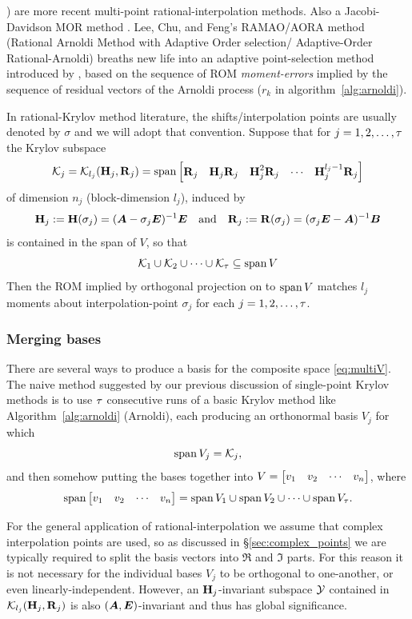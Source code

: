 \cite{RAMAO,AORA,lassaux2003model,frangos2008}) are more recent multi-point rational-interpolation methods. Also a Jacobi-Davidson MOR method \cite{jacobiMOR}.   Lee, Chu, and Feng's  RAMAO/AORA method (Rational Arnoldi Method with Adaptive Order selection/ Adaptive-Order Rational-Arnoldi) \cite{RAMAO,AORA} breaths new life into an adaptive point-selection method introduced by \cite{gallivan1996rational}, based on the sequence of ROM \emph{moment-errors} implied by the sequence of residual vectors of the Arnoldi process ($r_k$ in algorithm~\ref{alg:arnoldi}).

In rational-Krylov method literature, the shifts/interpolation points are usually denoted by $\sigma$ and we will adopt that convention.   Suppose that for $j = 1,2,\ldots,\tau$ the Krylov subspace 
\[ 
\mathcal{K}_j=\mathcal{K}_{l_j}({\textbf{\textup{H}}_j},{\textbf{\textup{R}}_j}) = \operatorname*{span}\begin{bmatrix} \textbf{\textup{R}}_j & \textbf{\textup{H}}_j \textbf{\textup{R}}_j & \textbf{\textup{H}}_j^2 \textbf{\textup{R}}_j & \cdots & \textbf{\textup{H}}_j^{l_j-1} \textbf{\textup{R}}_j\end{bmatrix}
\]
 of dimension $n_j$ (block-dimension $l_j$), induced by 
\[
 \textbf{\textup{H}}_j := \textbf{\textup{H}}(\sigma_j)=(\bm{A}-\sigma_j \bm{E})^{-1}\bm{E} \quad \text{and} \quad 
 \textbf{\textup{R}}_j := \textbf{\textup{R}}(\sigma_j) = (\sigma_j \bm{E} - \bm{A})^{-1}\bm{B}
\]
is contained in the span of $V$, so that
\begin{equation}
\mathcal{K}_1 \cup \mathcal{K}_2 \cup \cdots \cup \mathcal{K}_\tau \subseteq \operatorname*{span} V
\label{eq:multiV} 
\end{equation}
Then the ROM implied by orthogonal projection on to  $\operatorname*{span} V$ matches $l_j$ moments about interpolation-point $\sigma_j$ for each $j=1,2,\ldots,\tau$.




\subsubsection{Merging bases}
There are several ways to produce a basis for the composite space \eqref{eq:multiV}.  The naive method suggested by our previous discussion of single-point Krylov methods is to use $\tau$ consecutive runs of a basic Krylov method like Algorithm~\ref{alg:arnoldi} (Arnoldi), each producing an orthonormal basis $V_j$ for which 
\[
\operatorname*{span} V_j = \mathcal{K}_j,
\]
and then somehow putting the bases together into $V = \begin{bmatrix} v_1&v_2&\cdots&v_n\end{bmatrix}$, where 
\begin{equation}
\operatorname*{span}  \begin{bmatrix} v_1&v_2&\cdots&v_n\end{bmatrix} = \operatorname*{span} V_1 \cup \operatorname*{span} V_2 \cup \cdots \cup \operatorname*{span} V_\tau.
\label{eq:multiV2}
\end{equation}


   For the general application of rational-interpolation we assume that complex interpolation points are used, so as discussed in \S\ref{sec:complex_points} we are typically required to split the basis vectors into $\Re$ and $\Im$  parts.   For this reason it is not necessary for the individual bases $V_j$ to be orthogonal to one-another, or even linearly-independent.  However, an $\textbf{\textup{H}}_j$-invariant subspace $\mathcal{Y}$ contained  in $\mathcal{K}_{l_j}({\textbf{\textup{H}}_j},{\textbf{\textup{R}}_j})$ is also $(\bm{A},\bm{E})$-invariant and thus has global significance. 

